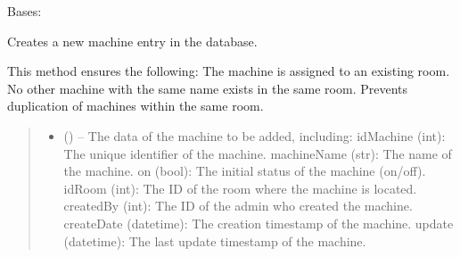 \documentclass[letterpaper,10pt,english]{sphinxmanual}
\begin{document}
\begin{fulllineitems}
\label{\detokenize{app.controllers:app.controllers.machine_controller.MachineController}}
\pysigstartsignatures
\pysiglinewithargsret
{}
{}
{}
\pysigstopsignatures
\sphinxAtStartPar
Bases: 

\begin{fulllineitems}
\label{\detokenize{app.controllers:app.controllers.machine_controller.MachineController.create_machine}}
\pysigstartsignatures
\pysiglinewithargsret
{}
{\sphinxparamcomma {}}
{}
\pysigstopsignatures
\sphinxAtStartPar
Creates a new machine entry in the database.

\sphinxAtStartPar
This method ensures the following:
\sphinxhyphen{} The machine is assigned to an existing room.
\sphinxhyphen{} No other machine with the same name exists in the same room.
\sphinxhyphen{} Prevents duplication of machines within the same room.
\begin{quote}\begin{description}
\begin{itemize}
\item {} 
\sphinxAtStartPar
{} () – The data of the machine to be added, including:
\sphinxhyphen{} idMachine (int): The unique identifier of the machine.
\sphinxhyphen{} machineName (str): The name of the machine.
\sphinxhyphen{} on (bool): The initial status of the machine (on/off).
\sphinxhyphen{} idRoom (int): The ID of the room where the machine is located.
\sphinxhyphen{} createdBy (int): The ID of the admin who created the machine.
\sphinxhyphen{} createDate (datetime): The creation timestamp of the machine.
\sphinxhyphen{} update (datetime): The last update timestamp of the machine.


\end{itemize}
\end{description}
\end{quote}
\end{fulllineitems}
\end{fulllineitems}
\end{document}
